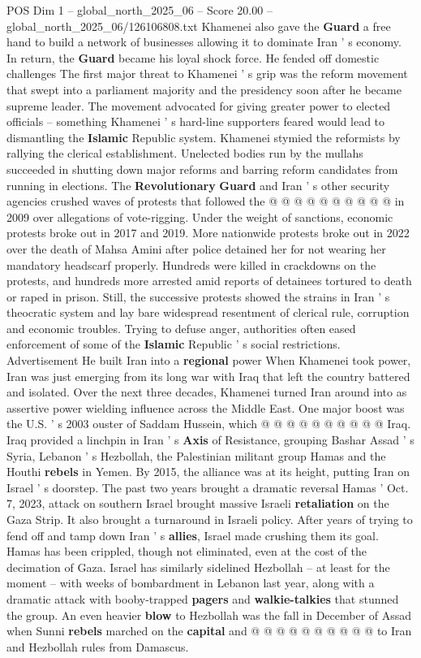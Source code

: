 \begin{textsample}{POS Dim 1 – global\_north\_2025\_06 – Score 20.00 – global\_north\_2025\_06/126106808.txt}
Khamenei also gave the \textbf{Guard} a free hand to build a network of businesses allowing it to dominate Iran ' s economy.
In return, the \textbf{Guard} became his loyal shock force.
He fended off domestic challenges The first major threat to Khamenei ' s grip was the reform movement that swept into a parliament majority and the presidency soon after he became supreme leader.
The movement advocated for giving greater power to elected officials -- something Khamenei ' s hard-line supporters feared would lead to dismantling the \textbf{Islamic} Republic system.
Khamenei stymied the reformists by rallying the clerical establishment.
Unelected bodies run by the mullahs succeeded in shutting down major reforms and barring reform candidates from running in elections.
The \textbf{Revolutionary} \textbf{Guard} and Iran ' s other security agencies crushed waves of protests that followed the @ @ @ @ @ @ @ @ @ @ in 2009 over allegations of vote-rigging.
Under the weight of sanctions, economic protests broke out in 2017 and 2019.
More nationwide protests broke out in 2022 over the death of Mahsa Amini after police detained her for not wearing her mandatory headscarf properly.
Hundreds were killed in crackdowns on the protests, and hundreds more arrested amid reports of detainees tortured to death or raped in prison.
Still, the successive protests showed the strains in Iran ' s theocratic system and lay bare widespread resentment of clerical rule, corruption and economic troubles.
Trying to defuse anger, authorities often eased enforcement of some of the \textbf{Islamic} Republic ' s social restrictions.
Advertisement He built Iran into a \textbf{regional} power When Khamenei took power, Iran was just emerging from its long war with Iraq that left the country battered and isolated.
Over the next three decades, Khamenei turned Iran around into as assertive power wielding influence across the Middle East.
One major boost was the U.S. ' s 2003 ouster of Saddam Hussein, which @ @ @ @ @ @ @ @ @ @ Iraq.
Iraq provided a linchpin in Iran ' s \textbf{Axis} of Resistance, grouping Bashar Assad ' s Syria, Lebanon ' s Hezbollah, the Palestinian militant group Hamas and the Houthi \textbf{rebels} in Yemen.
By 2015, the alliance was at its height, putting Iran on Israel ' s doorstep.
The past two years brought a dramatic reversal Hamas ' Oct. 7, 2023, attack on southern Israel brought massive Israeli \textbf{retaliation} on the Gaza Strip.
It also brought a turnaround in Israeli policy.
After years of trying to fend off and tamp down Iran ' s \textbf{allies}, Israel made crushing them its goal.
Hamas has been crippled, though not eliminated, even at the cost of the decimation of Gaza.
Israel has similarly sidelined Hezbollah -- at least for the moment -- with weeks of bombardment in Lebanon last year, along with a dramatic attack with booby-trapped \textbf{pagers} and \textbf{walkie-talkies} that stunned the group.
An even heavier \textbf{blow} to Hezbollah was the fall in December of Assad when Sunni \textbf{rebels} marched on the \textbf{capital} and @ @ @ @ @ @ @ @ @ @ to Iran and Hezbollah rules from Damascus.


\end{textsample}
